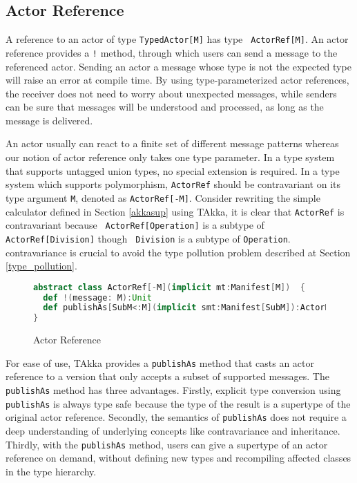 \subsection{Actor Reference}
\label{actor_ref}
A reference to an actor of type {\tt TypedActor[M]} has type {\tt
ActorRef[M]}.  An actor reference provides a {\tt !} method, through which users
can send a message to the referenced actor.  Sending an actor a
message whose type is not the expected type will raise an error at compile
time. By using type-parameterized actor
references, the receiver does not need to worry about unexpected messages, while
senders can be sure that messages will be understood and processed, as long as
the message is delivered.

An actor usually can react to a finite set of different message patterns 
whereas our notion of actor reference only takes one type parameter.  In a 
type system that supports untagged union types, no special extension is
required.  In a type system which supports polymorphism, {\tt ActorRef} should
be contravariant on its type argument {\tt M}, denoted as {\tt ActorRef[-M]}.
Consider rewriting the simple calculator defined in Section \ref{akkasup} using  
TAkka, it is clear that {\tt ActorRef} is contravariant because {\tt 
ActorRef[Operation]} is a subtype of {\tt ActorRef[Division]} though {\tt 
Division} is a subtype of {\tt Operation}. contravariance is crucial to avoid 
the type pollution problem described at Section \ref{type_pollution}.  

\begin{figure}[h]
\label{ActorRef}
      \begin{lstlisting}[language=scala]
abstract class ActorRef[-M](implicit mt:Manifest[M])  {
  def !(message: M):Unit
  def publishAs[SubM<:M](implicit smt:Manifest[SubM]):ActorRef[SubM]
}
    \end{lstlisting}
    \caption{Actor Reference}
\end{figure}

For ease of use, TAkka provides a {\tt publishAs}
method that casts an actor reference to a version that only accepts a 
subset of supported messages.  The {\tt publishAs} method has three 
advantages. Firstly,  explicit type conversion using {\tt publishAs} is always 
type safe because the type of the result is a supertype of the original actor 
reference.  Secondly, the semantics of {\tt publishAs} does not require a deep 
understanding of underlying concepts like contravariance and inheritance.  
Thirdly, with the {\tt publishAs} method, users can give a supertype of an 
actor reference on demand, without defining new types and recompiling affected 
classes in the type hierarchy.

